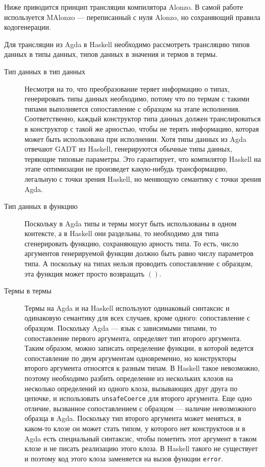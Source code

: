 Ниже приводится принцип трансляции компилятора Alonzo\cite{Ben07}. В самой работе используется
MAlonzo --- переписанный с нуля Alonzo, но сохраняющий правила кодогенерации.

Для трансляции из Agda в Haskell необходимо рассмотреть трансляцию типов данных в типы данных,
типов данных в значения и термов в термы.

\begin{description}
\item[Тип данных в тип данных]
   Несмотря на то, что преобразование теряет информацию о типах, генерировать типы данных необходимо,
   потому что по термам с такими типами выполняется сопоставление с образцом на этапе исполнения.
   Соответственно, каждый конструктор типа данных должен транслироваться в конструктор с такой же
   арностью, чтобы не терять информацию, которая может быть использована при исполнении. Хотя типы
   данных из Agda отвечают GADT из Haskell, генерируются обычные типы данных, теряющие типовые параметры.
   Это гарантирует, что компилятор Haskell на этапе оптимизации не произведет какую-нибудь трансформацию,
   легальную с точки зрения Haskell, но меняющую семантику с точки зрения Agda.
\item[Тип данных в функцию]
   Поскольку в Agda типы и термы могут быть использованы в одном контексте, а в Haskell они раздельны,
   то необходимо для типа сгенерировать функцию, сохраняющую арность типа. То есть, число аргументов
   генерируемой функции должно быть равно числу параметров типа. А поскольку на типах нельзя
   проводить сопоставление с образцом, эта функция может просто возвращать \(()\).
\item[Термы в термы]
   Термы на Agda и на Haskell используют одинаковый синтаксис и одинаковую семантику для всех случаев,
   кроме одного: сопоставление с образцом. Поскольку Agda --- язык с зависимыми типами, то сопоставление
   первого аргумента, определяет тип второго аргумента. Таким образом, можно записать определение функции,
   в которой ведется сопоставление по двум аргументам одновременно, но конструкторы второго аргумента относятся
   к разным типам. В Haskell такое невозможно, поэтому необходимо разбить определение из нескольких клозов на
   несколько определений из одного клоза, вызывающих друг друга по цепочке, и использовать \texttt{unsafeCoerce}
   для второго аргумента. Еще одно отличие, вызванное сопоставлением с образцом --- наличие невозможного образца
   в Agda. Поскольку тип второго аргумента может меняться, в каком-то клозе он может стать типом, у которого нет
   конструктоов и в Agda есть специальный синтаксис, чтобы пометить этот аргумент в таком клозе и не писать
   реализацию этого клоза. В Haskell такого не существует и поэтому код этого клоза заменяется на вызов функции
   \texttt{error}.
\end{description}
